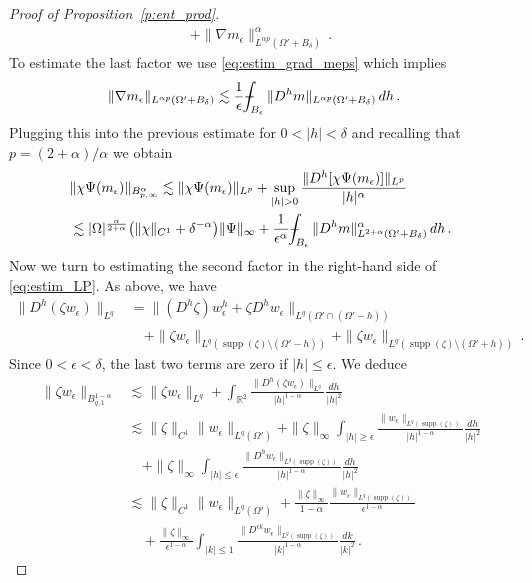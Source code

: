 \documentclass[fleqn
]{article}
\numberwithin{equation}{section}
\newcommand{\R}{{\mathbb R}}
\newcommand{\e}{\epsilon}
\DeclareMathOperator{\supp}{supp}
\def\Xint#1{\mathchoice
	{\XXint\displaystyle\textstyle{#1}}%
	{\XXint\textstyle\scriptstyle{#1}}%
	{\XXint\scriptstyle\scriptscriptstyle{#1}}%
	{\XXint\scriptscriptstyle\scriptscriptstyle{#1}}%
	\!\int}
\def\XXint#1#2#3{{\setbox0=\hbox{$#1{#2#3}{\int}$}
		\vcenter{\hbox{$#2#3$}}\kern-.5\wd0}}
\theoremstyle{definition}
\begin{document}
\begin{proof}[Proof of Proposition~\ref{p:ent_prod}]
\begin{align*}
+
\|\nabla m_\e \|^\alpha_{L^{\alpha p}(\Omega'+B_\delta)}\,.
\end{align*}
%
To estimate the last factor we use \eqref{eq:estim_grad_meps} 
which implies
\begin{align*}
\|\nabla m_\e\|_{L^{\alpha p}(\Omega'+B_\delta)}
&
\lesssim
\frac 1\e
\Xint{-}_{B_\e}
\|D^h m\|_{L^{\alpha p}(\Omega'+B_\delta)} \, dh\,.
\end{align*}
Plugging this into the previous estimate for $0<|h|<\delta$
and
recalling that $p=(2+\alpha)/\alpha$
we obtain
\begin{align}
&
\|\chi\Psi(m_\e)\|_{B^{\alpha}_{p,\infty}}
\lesssim
\|\chi\Psi(m_\e)\|_{L^p} +
\sup_{|h|>0} \frac{\|D^h[\chi\Psi(m_\e)]\|_{L^p}}{|h|^\alpha}
\nonumber
\\
&
\lesssim |\Omega|^{\frac {\alpha}{2+\alpha}}\big(\|\chi\|_{C^1} +\delta^{-\alpha} \big)
\|\Psi\|_\infty
+\frac{1}{\e^\alpha}
\Xint{-}_{B_\e}
\|D^h m\|^\alpha_{L^{2+\alpha}(\Omega'+B_\delta)} \, dh\,.
\label{eq:chiPsiBalphapinfty}
\end{align}
Now we turn to estimating the second factor in the right-hand side of \eqref{eq:estim_LP}.
As above, we have
\begin{align*}
\|D^h(\zeta w_\e)\|_{L^q}
&
=\|(D^h\zeta) w_\e^h +\zeta D^h w_\e\|_{L^q(\Omega' \cap (\Omega'-h))}
\\
&
\quad
+\|\zeta w_\e\|_{L^q(\supp(\zeta)\setminus (\Omega'-h))}
+\|\zeta  w_\e \|_{L^q( \supp(\zeta)\setminus(\Omega'+h))}\,.
\end{align*}
Since $0<\e<\delta$, the last two terms are zero if $|h|\leq \e$.
We deduce
\begin{align*}
\|\zeta w_\e\|_{B^{1-\alpha}_{q,1}}
&
\lesssim 
\|\zeta w_\e\|_{L^q}
+
\int_{\R^2} \frac{\|D^h(\zeta w_\e)\|_{L^q}}
{|h|^{1-\alpha}}
\frac{dh}{|h|^2}
\\
&
\lesssim 
 \|\zeta\|_{C^1} \|w_\e\|_{L^q(\Omega')}
+\|\zeta\|_\infty \int_{|h|\geq\e} \frac{\| w_\e\|_{L^q(\supp(\zeta))}}{|h|^{1-\alpha}}\frac{dh}{|h|^2}
\\
&
\quad
+\|\zeta\|_\infty \int_{|h|\leq\e} \frac{\|D^hw_\e\|_{L^q(\supp(\zeta))}}{|h|^{1-\alpha}}\frac{dh}{|h|^2}
\\
&
\lesssim 
\|\zeta\|_{C^1} \|w_\e\|_{L^q(\Omega')}
+\frac{\|\zeta\|_\infty}{1-\alpha}  \frac{\| w_\e\|_{L^q(\supp(\zeta))}}{\e^{1-\alpha}}
\\
&
\quad
+\frac{ \|\zeta\|_\infty}{\e^{1-\alpha}} \int_{|k|\leq 1} \frac{\|D^{\e k } w_\e\|_{L^q(\supp(\zeta))}}{|k|^{1-\alpha}}\frac{dk}{|k|^2}\,.
\end{align*}

\end{proof}
\end{document}
